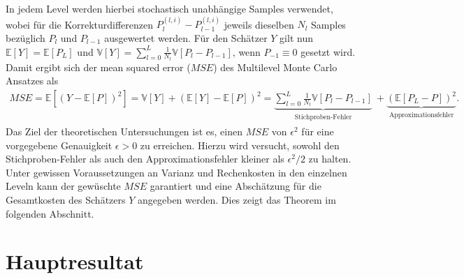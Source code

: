 \documentclass[10pt,a4paper]{article}
\begin{document}
In jedem Level werden hierbei stochastisch unabhängige Samples verwendet, wobei für die Korrekturdifferenzen $P_l^{(l,i)}-P_{l-1}^{(l,i)}$ jeweils dieselben $N_l$ Samples bezüglich $P_l$ und $P_{l-1}$ ausgewertet werden.
\newline
Für den Schätzer $Y$ gilt nun $\mathbb{E}[Y]=\mathbb{E}[P_L]$ und $\mathbb{V}[Y]=\sum\limits_{l=0}^L\frac{1}{N_l}\mathbb{V}[P_l-P_{l-1}]$, wenn $P_{-1}\equiv 0$ gesetzt wird. Damit ergibt sich der mean squared error ($MSE$) des Multilevel Monte Carlo Ansatzes als
\begin{align}
	MSE=\mathbb{E}\left[(Y-\mathbb{E}[P])^2\right]=\mathbb{V}[Y]+(\mathbb{E}[Y]-\mathbb{E}[P])^2=\underbrace{\sum\limits_{l=0}^{L}\frac{1}{N_l}\mathbb{V}[P_l-P_{l-1}]}_{\substack{\text{Stichproben-Fehler}}}\ +\underbrace{(\mathbb{E}[P_L-P])^2}_{\substack{\text{Approximationsfehler}}}. \label{MSEMultilevelMonteCarlo}
\end{align}
Das Ziel der theoretischen Untersuchungen ist es, einen $MSE$ von $\epsilon^2$ für eine vorgegebene Genauigkeit $\epsilon>0$ zu erreichen. Hierzu wird versucht, sowohl den Stichproben-Fehler als auch den Approximationsfehler kleiner als $\epsilon^2/2$ zu halten. Unter gewissen Voraussetzungen an Varianz und Rechenkosten in den einzelnen Leveln kann der gewüschte $MSE$ garantiert und eine Abschätzung für die Gesamtkosten des Schätzers $Y$ angegeben werden. Dies zeigt das Theorem im folgenden Abschnitt.

\section{Hauptresultat}
\end{document}
